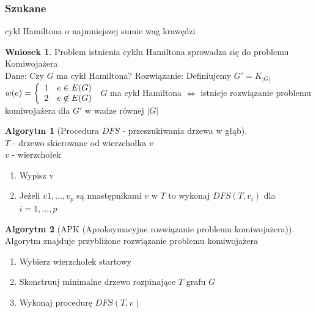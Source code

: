 \documentclass[12pt,a4paper]{article}
\theoremstyle{definition}
\newtheorem{wniosek}{Wniosek}
\newtheorem{algo}{Algorytm}
\begin{document}
\subsubsection{Szukane} cykl Hamiltona o najmniejszej sumie wag krawędzi
\begin{wniosek}
Problem istnienia cyklu Hamiltona sprowadza się do problemu Komiwojażera\\
Dane: Czy $G$ ma cykl Hamiltona?
Rozwiązanie: Definiujemy $G' = K_{|G|}$\\
$w(e) = \left\lbrace
	\begin{array}{l l}
		1 & e\in E(G)\\
		2 & e\not\in E(G)
	\end{array}\right.
$
$G$ ma cykl Hamiltona $\Leftrightarrow$ istnieje rozwiązanie problemu komiwojażera dla $G'$ w wadze równej $|G|$
\end{wniosek}

\begin{algo}[Procedura $DFS$ - przeszukiwania drzewa w głąb]~\\
$T$ - drzewo skierowane od wierzchołka $v$\\
$v$ - wierzchołek
\begin{enumerate}
	\item Wypisz v
	\item Jeżeli $v1, \dots, v_p$ są nnastępnikami $v$ w $T$ to wykonaj $DFS(T, v_i)$ dla $i = 1, \dots, p$
\end{enumerate}
\end{algo}

\begin{algo}[APK (Aproksymacyjne rozwiązanie problemu komiwojażera)]~\\\label{algo:apk}
Algorytm znajduje przybliżone rozwiązanie problemu komiwojażera
\begin{enumerate}
	\item Wybierz wierzchołek startowy
	\item Skonstruuj minimalne drzewo rozpinające $T$ grafu $G$
	\item Wykonaj procedurę $DFS(T, v)$
\end{enumerate}
\end{algo}
\end{document}
